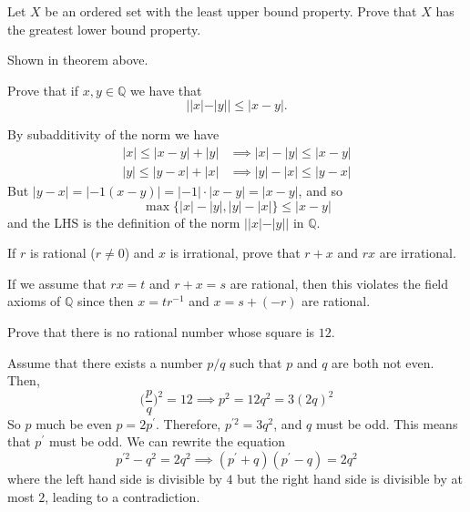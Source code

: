  \begin{exercise}
    Let $X$ be an ordered set with the least upper bound property. Prove that $X$ has the greatest lower bound property.
  \end{exercise}
  \begin{solution}
    Shown in theorem above. 
  \end{solution}

  \begin{exercise}
    Prove that if $x, y \in \mathbb{Q}$ we have that
    \begin{equation}
      ||x| - |y|| \leq |x - y|.
    \end{equation}
  \end{exercise}
  \begin{solution}
    By subadditivity of the norm we have 
    \begin{align}
      |x| \leq |x - y| + |y| & \implies |x| - |y| \leq |x - y| \\
      |y| \leq |y - x| + |x| & \implies |y| - |x| \leq |y - x| 
    \end{align}
    But $|y - x| = |-1 (x - y)| = |-1| \cdot |x - y| = |x - y|$, and so 
    \begin{equation}
      \max\{ |x| - |y|, |y| - |x| \} \leq |x - y|
    \end{equation}
    and the LHS is the definition of the norm $||x| - |y||$ in $\mathbb{Q}$. 
  \end{solution}

  \begin{exercise}[Rudin 1.1]
    If $r$ is rational ($r \neq 0$) and $x$ is irrational, prove that $r + x$ and $rx$ are irrational. 
  \end{exercise}
  \begin{solution}
    If we assume that $r x = t$ and $r + x = s$ are rational, then this violates the field axioms of $\mathbb{Q}$ since then $x = t r^{-1}$ and $x = s + (-r)$ are rational. 
  \end{solution}

  \begin{exercise}[Rudin 1.2]
    Prove that there is no rational number whose square is $12$. 
  \end{exercise}
  \begin{solution}
    Assume that there exists a number $p/q$ such that $p$ and $q$ are both not even. Then, 
    \begin{equation}
      \bigg( \frac{p}{q} \bigg)^2 = 12 \implies p^2 = 12q^2 = 3 (2 q)^2
    \end{equation}
    So $p$ much be even $p = 2 p^\prime$. Therefore, $p^{\prime 2} = 3 q^2$, and $q$ must be odd. This means that $p^\prime$ must be odd. We can rewrite the equation 
    \begin{equation}
      p^{\prime 2} - q^2 = 2 q^2 \implies (p^\prime + q) (p^\prime - q) = 2q^2
    \end{equation}
    where the left hand side is divisible by $4$ but the right hand side is divisible by at most $2$, leading to a contradiction. 
  \end{solution}

